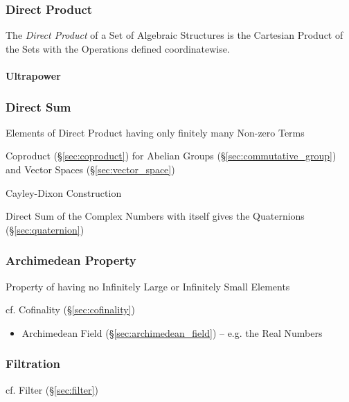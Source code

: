 \subsubsection{Direct Product}\label{sec:direct_product}

The \emph{Direct Product} of a Set of Algebraic Structures is the Cartesian
Product of the Sets with the Operations defined coordinatewise.



\paragraph{Ultrapower}\label{sec:ultrapower}\hfill



\subsubsection{Direct Sum}\label{sec:direct_sum}

Elements of Direct Product having only finitely many Non-zero Terms

Coproduct (\S\ref{sec:coproduct}) for Abelian Groups
(\S\ref{sec:commutative_group}) and Vector Spaces (\S\ref{sec:vector_space})

Cayley-Dixon Construction

Direct Sum of the Complex Numbers with itself gives the Quaternions
(\S\ref{sec:quaternion})



\subsubsection{Archimedean Property}\label{sec:archimedean_property}

Property of having no Infinitely Large or Infinitely Small Elements

cf. Cofinality (\S\ref{sec:cofinality})

\begin{itemize}
  \item Archimedean Field (\S\ref{sec:archimedean_field}) -- e.g. the Real
    Numbers
\end{itemize}



\subsubsection{Filtration}\label{sec:filtration}

cf. Filter (\S\ref{sec:filter})

